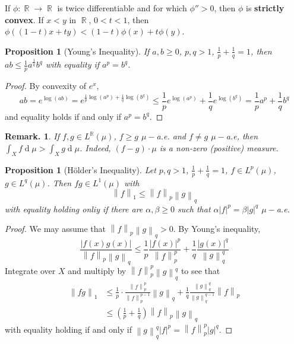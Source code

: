 \documentclass[12pt, a4paper]{memoir}
\DeclareMathOperator{\R}{{\mathbb{R}}}
\newcommand{\norm}[1]{\ensuremath{\left\lVert#1\right\rVert}} %
\newtheorem{proposition}[theorem]{Proposition}
\theoremstyle{nonumberplain}
\newtheorem{remark}{Remark.}
\newtheorem{proof}{Proof}
\renewcommand{\d}[1]{\ensuremath{\operatorname{d}\!{#1}}} %
\begin{document}
If $\phi:\R\to\R$ is twice differentiable and for which $\phi''>0$, then $\phi$ is \textbf{strictly convex}.
If $x<y$ in $\R$, $0<t<1$, then $\phi((1-t)x+ty)<(1-t)\phi(x)+t\phi(y)$.
\begin{proposition}[Young's Inequality]
    If $a,b\geq 0$, $p,q>1$, $\frac{1}{p}+\frac{1}{q}=1$, then $ab\leq\frac{1}{p}a^\frac{1}{q}b^q$ with equality if $a^p=b^q$.
\end{proposition}
\begin{proof}
    By convexity of $e^x$,
    \begin{equation*}
        ab=e^{\log(ab)}=e^{\frac{1}{p}\log(a^p)+\frac{1}{q}\log(b^q)}\leq\frac{1}{p}e^{\log(a^p)}+\frac{1}{q}e^{\log(b^q)}=\frac{1}{p}a^p+\frac{1}{q}b^q
    \end{equation*}
    and equality holds if and only if $a^p=b^q$.
\end{proof}
\begin{remark}
    If $f,g\in L^{\R}(\mu)$, $f\geq g$ $\mu-$a.e. and $f\neq g$ $\mu-$a.e, then $\int_X f\d{\mu}>\int_X g\d{\mu}$.
    Indeed, $(f-g)\cdot\mu$ is a non-zero (positive) measure.
\end{remark}
\begin{proposition}[H\"older's Inequality]
    Let $p,q>1$, $\frac{1}{p}+\frac{1}{q}=1$, $f\in L^p(\mu)$, $g\in L^q(\mu)$.
    Then $fg\in L^1(\mu)$ with
    \begin{equation*}
        \norm{f}_1\leq\norm{f}_p\norm{g}_q
    \end{equation*}
    with equality holding onliy if there are $\alpha,\beta\geq 0$ such that $\alpha|f|^p=\beta|g|^q$ $\mu-$a.e.
\end{proposition}
\begin{proof}
    We may assume that $\norm{f}_p\norm{g}_q>0$.
    By Young's inequality,
    \begin{equation*}
        \frac{|f(x)g(x)|}{\norm{f}_p\norm{g}_q}\leq\frac{1}{p}\frac{|f(x)|^p}{\norm{f}_p^p}+\frac{1}{q}\frac{|g(x)|^q}{\norm{g}_q^q}
    \end{equation*}
    Integrate over $X$ and multiply by $\norm{f}_p^p\norm{g}_q^q$ to see that
    \begin{align*}
        \norm{fg}_1 &\leq\frac{1}{p}\cdot\frac{\norm{f}_p^p}{\norm{f}_p^{p-1}}\norm{g}_q+\frac{1}{q}\frac{\norm{g}_q^q}{\norm{g}_q^{q-1}}\norm{f}_p\\
                    &\leq\left(\frac{1}{p}+\frac{1}{q}\right)\norm{f}_p\norm{g}_q
    \end{align*}
    with equality holding if and only if $\norm{g}_q^q|f|^p=\norm{f}_p^p|g|^q$.
\end{proof}
\end{document}
